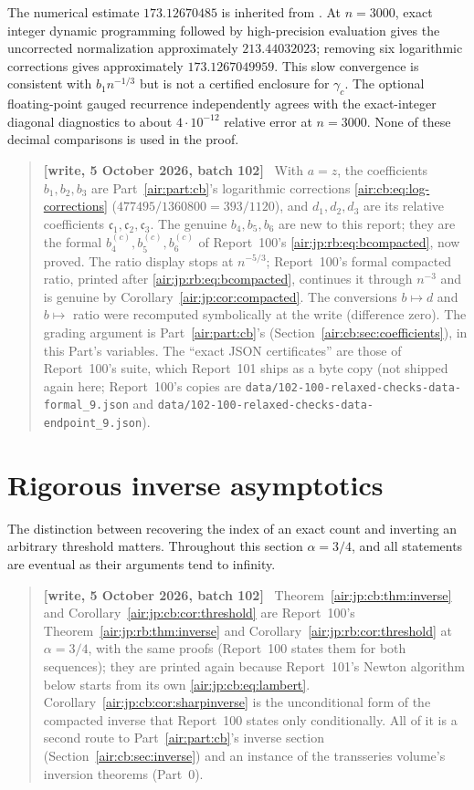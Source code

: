 \documentclass[11pt,letterpaper]{article}
\numberwithin{equation}{section}
\theoremstyle{remark}
\newenvironment{writenotejp}{\par\smallskip\begin{quote}\small\textbf{[write, 5 October 2026, batch 102]}\ }{\end{quote}\smallskip}
\newcommand{\repopath}[1]{\nolinkurl{#1}}
\begin{document}
The numerical estimate $173.12670485$ is inherited from \cite{epfw}. At $n=3000$, exact integer dynamic programming followed by high-precision evaluation gives the uncorrected normalization approximately $213.44032023$; removing six logarithmic corrections gives approximately $173.1267049959$. This slow convergence is consistent with $b_1n^{-1/3}$ but is not a certified enclosure for $\gamma_c$. The optional floating-point gauged recurrence independently agrees with the exact-integer diagonal diagnostics to about $4\cdot10^{-12}$ relative error at $n=3000$. None of these decimal comparisons is used in the proof.
\begin{writenotejp}
With $a=z$, the coefficients $b_1,b_2,b_3$ are Part~\ref{air:part:cb}'s logarithmic corrections \eqref{air:cb:eq:log-corrections} ($477495/1360800=393/1120$), and $d_1,d_2,d_3$ are its relative coefficients $\mathfrak c_1,\mathfrak c_2,\mathfrak c_3$. The genuine $b_4,b_5,b_6$ are new to this report; they are the formal $b^{(c)}_4,b^{(c)}_5,b^{(c)}_6$ of Report~100's \eqref{air:jp:rb:eq:bcompacted}, now proved. The ratio display stops at $n^{-5/3}$; Report~100's formal compacted ratio, printed after \eqref{air:jp:rb:eq:bcompacted}, continues it through $n^{-3}$ and is genuine by Corollary~\ref{air:jp:cor:compacted}. The conversions $b\mapsto d$ and $b\mapsto$ ratio were recomputed symbolically at the write (difference zero). The grading argument is Part~\ref{air:part:cb}'s (Section~\ref{air:cb:sec:coefficients}), in this Part's variables. The ``exact JSON certificates'' are those of Report~100's suite, which Report~101 ships as a byte copy (not shipped again here; Report~100's copies are \repopath{data/102-100-relaxed-checks-data-formal_9.json} and \repopath{data/102-100-relaxed-checks-data-endpoint_9.json}).
\end{writenotejp}

\section{Rigorous inverse asymptotics}\label{air:jp:cb:sec:inverse}
The distinction between recovering the index of an exact count and inverting an arbitrary threshold matters. Throughout this section $\alpha=3/4$, and all statements are eventual as their arguments tend to infinity.
\begin{writenotejp}
Theorem~\ref{air:jp:cb:thm:inverse} and Corollary~\ref{air:jp:cb:cor:threshold} are Report~100's Theorem~\ref{air:jp:rb:thm:inverse} and Corollary~\ref{air:jp:rb:cor:threshold} at $\alpha=3/4$, with the same proofs (Report~100 states them for both sequences); they are printed again because Report~101's Newton algorithm below starts from its own \eqref{air:jp:cb:eq:lambert}. Corollary~\ref{air:jp:cb:cor:sharpinverse} is the unconditional form of the compacted inverse that Report~100 states only conditionally. All of it is a second route to Part~\ref{air:part:cb}'s inverse section (Section~\ref{air:cb:sec:inverse}) and an instance of the transseries volume's inversion theorems (Part~0).
\end{writenotejp}
\end{document}

